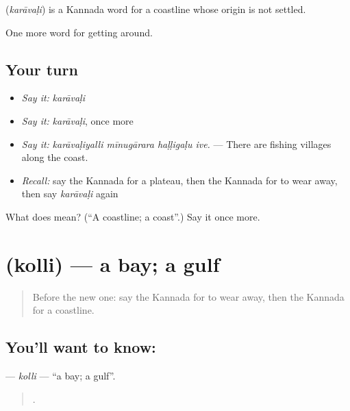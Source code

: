 \begin{cousinweb}
\textbf{} (\emph{karāvaḷi}) is a Kannada word for a coastline whose origin is not settled.
\end{cousinweb}

\begin{grammarlens}[title={What you've built}]
One more word for getting around.
\end{grammarlens}

\subsection*{Your turn}
\begin{itemize}
\raggedright
  \item \emph{Say it:} \emph{karāvaḷi}
  \item \emph{Say it:} \emph{karāvaḷi}, once more
  \item \emph{Say it:} \emph{karāvaḷiyalli mīnugārara haḷḷigaḷu ive.} — There are fishing villages along the coast.
  \item \emph{Recall:} say the Kannada for a plateau, then the Kannada for to wear away, then say \emph{karāvaḷi} again
\end{itemize}

\begin{tcolorbox}[breakable,colback=teal!4,colframe=teal!35!black,title={Before you move on}]
What does  mean? (\textquotedblleft{}A coastline; a coast\textquotedblright{}.) Say it once more.
\end{tcolorbox}
\section[\texorpdfstring{\kn{ಕೊಲ್ಲಿ} (kolli)}{ಕೊಲ್ಲಿ (kolli)}]{ (kolli) — a bay; a gulf}

\label{lesson:KA-C481-kolli}



\begin{quote}
Before the new one: say the Kannada for to wear away, then the Kannada for a coastline.
\end{quote}

\subsection*{You'll want to know: }
\textbf{} — \emph{kolli} — \textquotedblleft{}a bay; a gulf\textquotedblright{}.

\begin{quote}
  .
\end{quote}

